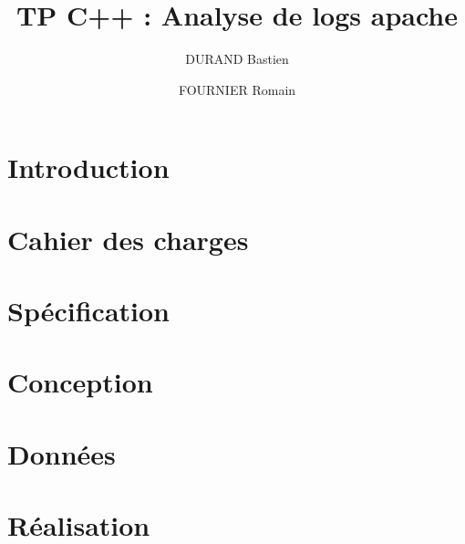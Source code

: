 \documentclass[a4paper]{article}
\title{TP C++ \no 4 : 
\bigbreak
Analyse de logs apache
}
\author{DURAND Bastien \and FOURNIER Romain}
\begin{document}
\maketitle
\thispagestyle{fancy}

\tableofcontents
\smallbreak

\section*{Introduction}\noindent
\newpage

\section{Cahier des charges}\noindent

\section{Spécification}\noindent

\section{Conception}\noindent

\section{Données}\noindent

\section{Réalisation}\noindent
\end{document}

